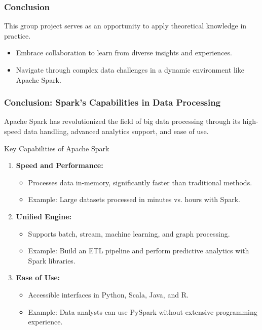 \documentclass[aspectratio=169]{beamer}
\begin{document}
\begin{frame}
    \frametitle{Conclusion}
    This group project serves as an opportunity to apply theoretical knowledge in practice. 
    \begin{itemize}
        \item Embrace collaboration to learn from diverse insights and experiences.
        \item Navigate through complex data challenges in a dynamic environment like Apache Spark.
    \end{itemize}
\end{frame}

\begin{frame}[fragile]
    \frametitle{Conclusion: Spark's Capabilities in Data Processing}
    
    Apache Spark has revolutionized the field of big data processing through its high-speed data handling, advanced analytics support, and ease of use. 

    \begin{block}{Key Capabilities of Apache Spark}
        \begin{enumerate}
            \item \textbf{Speed and Performance:}
            \begin{itemize}
                \item Processes data in-memory, significantly faster than traditional methods.
                \item Example: Large datasets processed in minutes vs. hours with Spark.
            \end{itemize}

            \item \textbf{Unified Engine:}
            \begin{itemize}
                \item Supports batch, stream, machine learning, and graph processing.
                \item Example: Build an ETL pipeline and perform predictive analytics with Spark libraries.
            \end{itemize}

            \item \textbf{Ease of Use:}
            \begin{itemize}
                \item Accessible interfaces in Python, Scala, Java, and R.
                \item Example: Data analysts can use PySpark without extensive programming experience.
            \end{itemize}


\end{enumerate}
\end{block}
\end{frame}
\end{document}
